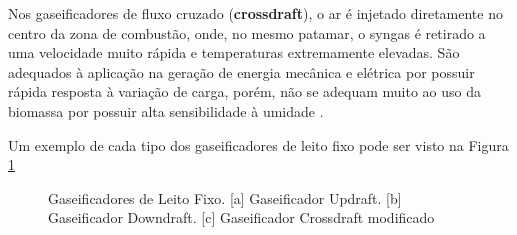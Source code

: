 Nos gaseificadores de fluxo cruzado (\textbf{crossdraft}), o ar é injetado diretamente no centro da zona de combustão, onde, no mesmo patamar, o syngas é retirado a uma velocidade muito rápida e temperaturas extremamente elevadas. São adequados à aplicação na geração de energia mecânica e elétrica por possuir rápida resposta à variação de carga, porém, não se adequam muito ao uso da biomassa por possuir alta sensibilidade à umidade \cite{sanchez2010}.

Um exemplo de cada tipo dos gaseificadores de leito fixo pode ser visto na Figura \ref{gaseificadores_principais}

\begin{figure}[!htb]
	\centering
	\quad %
	\caption{Gaseificadores de Leito Fixo. [a] Gaseificador Updraft. [b] Gaseificador Downdraft. [c] Gaseificador Crossdraft \cite{mandl2009} modificado}
	\label{gaseificadores_principais}
\end{figure}


